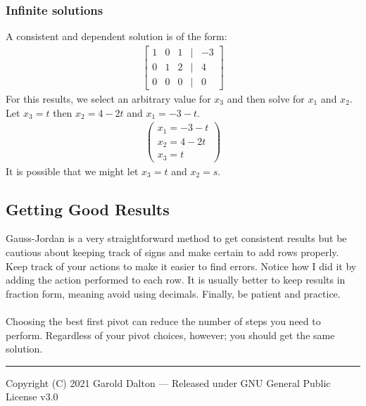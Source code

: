 \documentclass[14pt]{extarticle}
\begin{document}
\subsubsection*{Infinite solutions}
A consistent and dependent solution is of the form:
\begin{align*}
	\begin{bmatrix}
		1 & 0 & 1 & | & -3 \\
		0 & 1 & 2 & | & 4 \\
		0 & 0 & 0 & | & 0
	\end{bmatrix}
\end{align*}
For this results, we select an arbitrary value for $x_3$ and then solve for $x_1$ and $x_2$. Let $x_3=t$ then $x_2 = 4-2t$ and $x_1=-3-t$.
\begin{align*}
	\begin{pmatrix}
		x_1 = -3-t	\\
		x_2 = 4 -2t	\\
		x_3 = t	
	\end{pmatrix}
\end{align*}
It is possible that we might let $x_3 = t$ and $x_2=s$.

\subsection*{Getting Good Results}
Gauss-Jordan is a very straightforward method to get consistent results but be cautious about keeping track of signs and make certain to add rows properly. Keep track of your actions to make it easier to find errors. Notice how I did it by adding the action performed to each row. It is usually better to keep results in fraction form, meaning avoid using decimals. Finally, be patient and practice.
\\\\
Choosing the best first pivot can reduce the number of steps you need to perform. Regardless of your pivot choices, however; you should get the same solution.

\noindent\rule{\textwidth}{1pt}
{\footnotesize Copyright (C) 2021 Garold Dalton --- Released under GNU General Public License v3.0}
\end{document}
